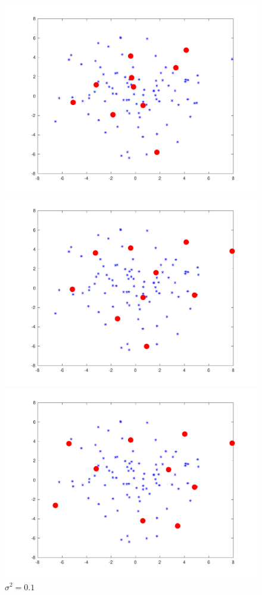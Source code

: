 \begingroup
\setlength{\columnsep}{0.5cm}
\setlength{\intextsep}{0cm}
\begin{figure}
\begin{minipage}{\linewidth}
    \centering\captionsetup[subfigure]{justification=centering}
    \includegraphics[width=\linewidth]{../src/figures/fixedsize/fixedsize_1}
    \caption*{$\sigma^2=0.01$}
\includegraphics[width=\linewidth]{../src/figures/fixedsize/fixedsize_10}
    \caption*{$\sigma^2=0.1$}
\includegraphics[width=\linewidth]{../src/figures/fixedsize/fixedsize_100}

\end{minipage}
\end{figure}
